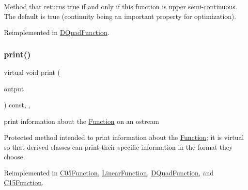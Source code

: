 Method that returns true if and only if this function is upper semi-\/continuous. The default is true (continuity being an important property for optimization). 

Reimplemented in \mbox{\hyperlink{class_s_m_spp__di__unipi__it_1_1_d_quad_function_acb905dad2242bc107ae51cab2a7f1af3}{D\+Quad\+Function}}.

\mbox{\label{class_s_m_spp__di__unipi__it_1_1_function_a2e7b9c9148a98c5c342e8c25cac95926}} 
\subsubsection{\texorpdfstring{print()}{print()}}
{\footnotesize\ttfamily virtual void print (\begin{DoxyParamCaption}\item[{std\+::ostream \&}]{output }\end{DoxyParamCaption}) const\hspace{0.3cm}{\ttfamily [inline]}, {\ttfamily [protected]}, {\ttfamily [virtual]}}



print information about the \mbox{\hyperlink{class_s_m_spp__di__unipi__it_1_1_function}{Function}} on an ostream 

Protected method intended to print information about the \mbox{\hyperlink{class_s_m_spp__di__unipi__it_1_1_function}{Function}}; it is virtual so that derived classes can print their specific information in the format they choose. 

Reimplemented in \mbox{\hyperlink{class_s_m_spp__di__unipi__it_1_1_c05_function_a59a9fcbf8f9f86d348344b2073644b0e}{C05\+Function}}, \mbox{\hyperlink{class_s_m_spp__di__unipi__it_1_1_linear_function_a87f6fa05f41e6d6f00fc4e0b12321abc}{Linear\+Function}}, \mbox{\hyperlink{class_s_m_spp__di__unipi__it_1_1_d_quad_function_a4e1f59c2589efba7c429a92661a1f288}{D\+Quad\+Function}}, and \mbox{\hyperlink{class_s_m_spp__di__unipi__it_1_1_c15_function_a59a9fcbf8f9f86d348344b2073644b0e}{C15\+Function}}.

\mbox{\label{class_s_m_spp__di__unipi__it_1_1_function_a98c3b08492e868f06dfc9b5ada04cb8a}} 
